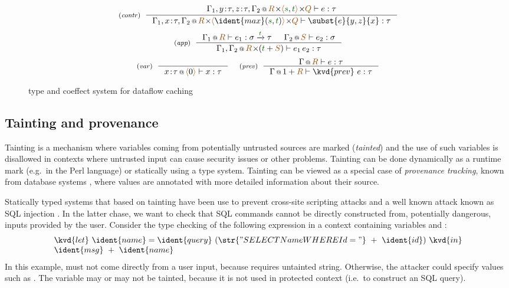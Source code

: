\begin{figure}[t]
\[
\tyrule{contr}
  {\coctx{\Gamma_1,y\!:\!\tau,z\!:\!\tau,\Gamma_2}{\aclrd{R}\cons\alift{\cclrd{s},\cclrd{t}} \cons \aclrd{Q}} \vdash e : \tau}
  {\coctx{\Gamma_1,x\!:\!\tau,\Gamma_2}{\aclrd{R}\cons\alift{\ident{max}(\cclrd{s},\cclrd{t})} \cons \aclrd{Q}} \vdash \subst{e}{y,z}{x} : \tau}
\]
\[
\tyrule{app}
  { \coctx{\Gamma_1}{\aclrd{R}} \vdash e_1 : \sigma \xrightarrow{\cclrd{t}} \tau &
    \coctx{\Gamma_2}{\aclrd{S}} \vdash e_2 : \sigma }
  { \coctx{\Gamma_1, \Gamma_2}{\aclrd{R} \cons (\cclrd{t} + \aclrd{S})} \vdash e_1 \, e_2 : \tau} 
\]
\[
\tyrule{var}{}
  {\coctx{x\!:\!\tau}{\alift{0}} \vdash x : \tau}
\quad\;
\tyrule{prev}
  {\coctx{\Gamma}{\aclrd{R}} \vdash e : \tau}
  {\coctx{\Gamma}{1 + \aclrd{R}} \vdash \kvd{prev}~e : \tau}  
\]
\caption{type and coeffect system for dataflow caching}
\label{fig:dataflow-coeff}
\end{figure}


\subsection{Tainting and provenance}
Tainting is a mechanism where variables coming from potentially untrusted sources are marked
(\emph{tainted}) and the use of such variables is disallowed in contexts where untrusted input
can cause security issues or other problems. Tainting can be done dynamically as a runtime mark
(e.g.~in the Perl language) or statically using a type system. Tainting can be viewed as a special
case of \emph{provenance tracking}, known from database systems \cite{app-provenance-db}, where
values are annotated with more detailed information about their source.

Statically typed systems that based on tainting have been use to prevent cross-site scripting
attacks \cite{app-tainting-xss} and a well known attack known as SQL injection
\cite{app-tainting-sql,app-tainting-wasp}. In the latter chase, we want to check that SQL commands 
cannot be directly constructed from, potentially dangerous, inputs provided by the user. Consider the 
type checking of the following expression in a context containing variables  and :
%
\begin{equation*}
\begin{array}{l}
\kvd{let}~\ident{name} = \ident{query}~(\str{"SELECT Name WHERE Id = "}~+~\ident{id})~\kvd{in}\\
\ident{msg}~+~\ident{name}
\end{array}
\end{equation*}
%
In this example,  must not come directly from a user input, because  requires 
untainted string. Otherwise, the attacker could specify values such as . 
The variable  may or may not be tainted, because it is not used in protected context 
(i.e.~to construct an SQL query). 

